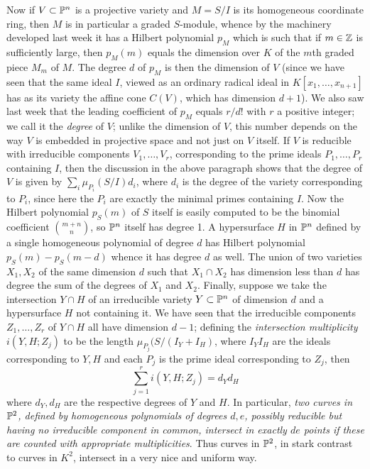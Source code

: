 \documentclass[10pt]{article}
\begin{document}
Now if $V\subset\Bbb P^n$ is a projective variety and $M=S/I$ is its
homogeneous coordinate ring, then $M$ is in particular a graded
$S$-module, whence by the machinery developed last week it has a Hilbert
polynomial $p_M$ which is such that if $m\in\Bbb Z$ is sufficiently
large, then $p_M(m)$ equals the dimension over $K$ of the $m$th graded
piece $M_m$ of $M$. The degree $d$ of $p_M$ is then the dimension of $V$
(since we have seen that the same ideal $I$, viewed as an ordinary
radical ideal in $K[x_1,\ldots,x_{n+1}]$ has as its variety the affine
cone $C(V)$, which has dimension $d+1$). We also saw last week that the
leading coefficient of $p_M$ equals $r/d!$ with $r$ a positive integer;
we call it the {\sl degree} of $V$; unlike the dimension of $V$, this
number depends on the way $V$ is embedded in projective space and not
just on $V$ itself. If $V$ is reducible with irreducible components
$V_1,\ldots,V_r$, corresponding to the prime ideals $P_1,\ldots,P_r$
containing $I$, then the discussion in the above paragraph shows that
the degree of $V$ is given by $\sum_i \mu_{P_i}(S/I) d_i$, where $d_i$
is the degree of the variety corresponding to $P_i$, since here the
$P_i$ are exactly the minimal primes containing $I$. Now the Hilbert
polynomial $p_S(m)$ of $S$ itself is easily computed to be the binomial
coefficient $m+n\choose n$, so $\Bbb P^n$ itself has degree 1. A
hypersurface $H$ in $\Bbb P^n$ defined by a single homogeneous
polynomial of degree $d$ has Hilbert polynomial $p_S(m) - p_S(m-d)$
whence it has degree $d$ as well. The union of two varieties $X_1,X_2$
of the same dimension $d$ such that $X_1\cap X_2$ has dimension less
than $d$ has degree the sum of the degrees of $X_1$ and $X_2$. Finally,
suppose we take the intersection $Y\cap H$ of an irreducible variety
$Y\subset\Bbb P^n$ of dimension $d$ and a hypersurface $H$ not
containing it. We have seen that the irreducible components
$Z_1,\ldots,Z_r$ of $Y\cap H$ all have dimension $d-1$; defining the
{\sl intersection multiplicity} $i(Y,H;Z_j)$ to be the length
$\mu_{P_j}(S/(I_Y + I_H)$, where $I_YI_H$ are the ideals corresponding
to $Y,H$ and each $P_j$ is the prime ideal corresponding to $Z_j$, then
 $$
 \sum_{j=1}^r i(Y,H;Z_j) = d_Y d_H
 $$
 \noindent where $d_Y,d_H$ are the respective degrees of $Y$ and $H$. In
 particular, {\sl two curves in $\Bbb P^2$, defined by homogeneous
   polynomials of degrees $d,e$, possibly reducible but having no
   irreducible component in common, intersect in exactly $de$ points if
   these are counted with appropriate multiplicities}. Thus curves in
 $\Bbb P^2$, in stark contrast to curves in $K^2$, intersect in a very
 nice and uniform way.
\end{document}
